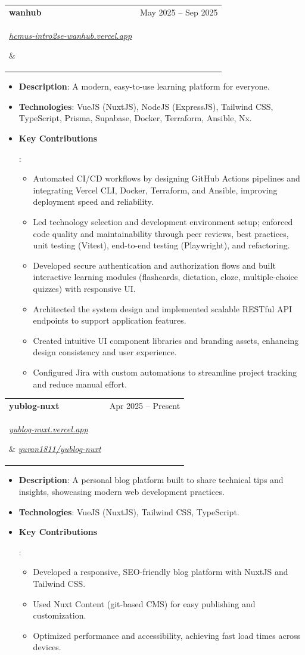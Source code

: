 \documentclass[letterpaper,11pt]{article}
\makeatletter
\newcommand{\resumeSubheading}[4]{\vspace{-1pt}\item
    \begin{tabular*}{0.97\textwidth}[t]{l@{\extracolsep{\fill}}r}
      \textbf{#1} & #2 \\
      \parbox[t]{0.5\textwidth}{\small\itshape#3} & \textit{\small#4} \\
    \end{tabular*}\vspace{-5pt}
}
\newcommand{\resumeItem}[2]{\item\small{\textbf{#1}{: #2\vspace{-2pt}}}}
\newcommand{\resumeItemListStart}{\begin{itemize}[leftmargin=*]}
\newcommand{\resumeItemListEnd}{\end{itemize}\vspace{-5pt}}
\makeatother
\begin{document}
\resumeSubheading
{wanhub}{May 2025 -- Sep 2025}
{\href{https://hcmus-intro2se-wanhub.vercel.app}{hcmus-intro2se-wanhub.vercel.app}}
{}
\resumeItemListStart
\resumeItem{Description}
{A modern, easy-to-use learning platform for everyone.}
\resumeItem{Technologies}
{VueJS (NuxtJS), NodeJS (ExpressJS), Tailwind CSS, TypeScript, Prisma, Supabase, Docker, Terraform, Ansible, Nx.}
\resumeItem{Key Contributions}
{\begin{itemize}[leftmargin=*]
		\item Automated CI/CD workflows by designing GitHub Actions pipelines and integrating Vercel CLI, Docker, Terraform, and Ansible, improving deployment speed and reliability.
		\item Led technology selection and development environment setup; enforced code quality and maintainability through peer reviews, best practices, unit testing (Vitest), end-to-end testing (Playwright), and refactoring.
		\item Developed secure authentication and authorization flows and built interactive learning modules (flashcards, dictation, cloze, multiple-choice quizzes) with responsive UI.
		\item Architected the system design and implemented scalable RESTful API endpoints to support application features.
		\item Created intuitive UI component libraries and branding assets, enhancing design consistency and user experience.
		\item Configured Jira with custom automations to streamline project tracking and reduce manual effort.
	\end{itemize}}
\resumeItemListEnd

\resumeSubheading
{yublog-nuxt}{Apr 2025 -- Present}
{\href{https://yublog-nuxt.vercel.app/}{yublog-nuxt.vercel.app}}
{\href{https://github.com/yuran1811/yublog-nuxt}{yuran1811/yublog-nuxt}}
\resumeItemListStart
\resumeItem{Description}
{A personal blog platform built to share technical tips and insights, showcasing modern web development practices.}
\resumeItem{Technologies}
{VueJS (NuxtJS), Tailwind CSS, TypeScript.}
\resumeItem{Key Contributions}
{\begin{itemize}[leftmargin=*]
		\item Developed a responsive, SEO-friendly blog platform with NuxtJS and Tailwind CSS\@.
		\item Used Nuxt Content (git-based CMS) for easy publishing and customization.
		\item Optimized performance and accessibility, achieving fast load times across devices.
	\end{itemize}}
\resumeItemListEnd
\end{document}
